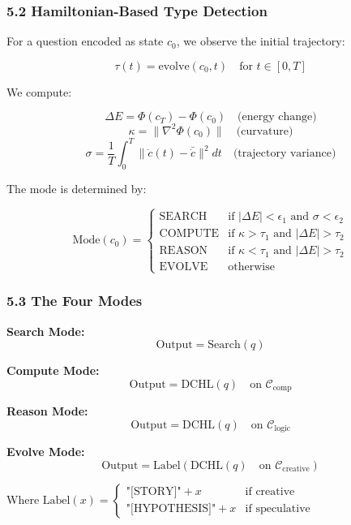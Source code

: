 \documentclass[
  11pt,
  a4paper,
]{article}
\begin{document}
\subsubsection{5.2 Hamiltonian-Based Type
Detection}\label{hamiltonian-based-type-detection-1}

For a question encoded as state \(c_0\), we observe the initial
trajectory:

\[
\tau(t) = \text{evolve}(c_0, t) \quad \text{for } t \in [0, T]
\]

We compute:

\[
\Delta E = \Phi(c_T) - \Phi(c_0) \quad \text{(energy change)}
\] \[
\kappa = \|\nabla^2 \Phi(c_0)\| \quad \text{(curvature)}
\] \[
\sigma = \frac{1}{T}\int_0^T \|\dot{c}(t) - \bar{\dot{c}}\|^2 dt \quad \text{(trajectory variance)}
\]

The mode is determined by:

\[
\text{Mode}(c_0) = \begin{cases}
\text{SEARCH} & \text{if } |\Delta E| < \epsilon_1 \text{ and } \sigma < \epsilon_2 \\
\text{COMPUTE} & \text{if } \kappa > \tau_1 \text{ and } |\Delta E| > \tau_2 \\
\text{REASON} & \text{if } \kappa < \tau_1 \text{ and } |\Delta E| > \tau_2 \\
\text{EVOLVE} & \text{otherwise}
\end{cases}
\]

\subsubsection{5.3 The Four Modes}\label{the-four-modes}

\textbf{Search Mode:} \[
\text{Output} = \text{Search}(q)
\]

\textbf{Compute Mode:} \[
\text{Output} = \text{DCHL}(q) \quad \text{on } \mathcal{C}_{\text{comp}}
\]

\textbf{Reason Mode:} \[
\text{Output} = \text{DCHL}(q) \quad \text{on } \mathcal{C}_{\text{logic}}
\]

\textbf{Evolve Mode:} \[
\text{Output} = \text{Label}(\text{DCHL}(q) \quad \text{on } \mathcal{C}_{\text{creative}})
\]

Where
\(\text{Label}(x) = \begin{cases} \text{"[STORY]"} + x & \text{if creative} \\ \text{"[HYPOTHESIS]"} + x & \text{if speculative} \end{cases}\)
\end{document}
